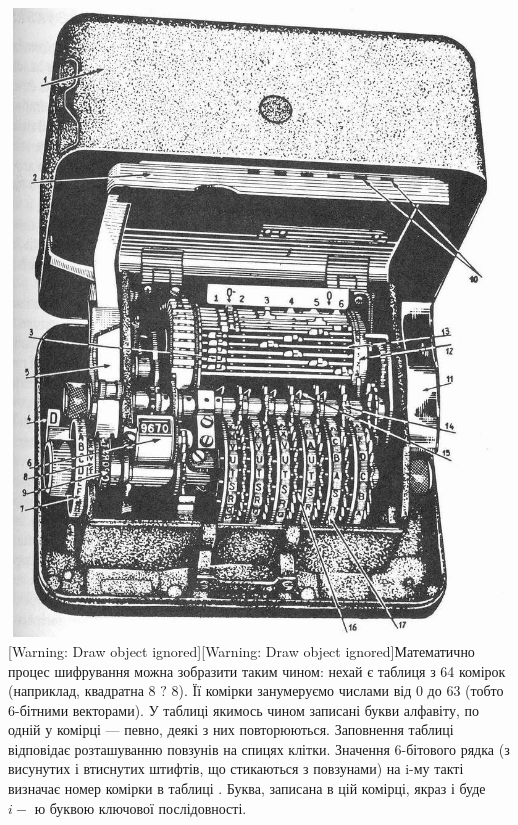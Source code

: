 \bigskip


\bigskip


\bigskip

 \includegraphics[width=5.6252in,height=6.5555in]{crypt-img/crypt-img77.jpg}
[Warning: Draw object ignored][Warning: Draw object ignored]Математично процес
шифрування можна зобразити таким чином: нехай є таблиця з 64 комірок
(наприклад, квадратна 8 ${?}$ 8). Її комірки занумеруємо числами від 0 до 63
(тобто 6-бітними векторами). У таблиці якимось чином записані букви алфавіту,
по одній у комірці --- певно, деякі з них повторюються.  Заповнення таблиці
відповідає розташуванню повзунів на спицях клітки. Значення 6-бітового рядка 
(з висунутих і втиснутих штифтів, що стикаються з повзунами) на i-му такті
визначає номер комірки в таблиці . Буква, записана в цій комірці, якраз і буде 
${i-}$ ю буквою ключової послідовності. 

